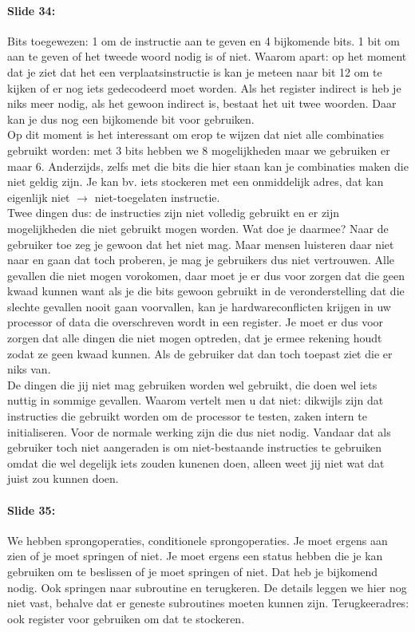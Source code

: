 \documentclass[10pt,a4paper]{book}
\begin{document}
\paragraph{Slide 34:} Bits toegewezen: 1 om de instructie aan te geven en 4 bijkomende bits. 1 bit om aan te geven of het tweede woord nodig is of niet. Waarom apart: op het moment dat je ziet dat het een verplaatsinstructie is kan je meteen naar bit 12 om te kijken of er nog iets gedecodeerd moet worden. Als het register indirect is heb je niks meer nodig, als het gewoon indirect is, bestaat het uit twee woorden. Daar kan je dus nog een bijkomende bit voor gebruiken.\\
Op dit moment is het interessant om erop te wijzen dat niet alle combinaties gebruikt worden: met 3 bits hebben we 8 mogelijkheden maar we gebruiken er maar 6. Anderzijds, zelfs met die bits die hier staan kan je combinaties maken die niet geldig zijn. Je kan bv. iets stockeren met een onmiddelijk adres, dat kan eigenlijk niet $\rightarrow$ niet-toegelaten instructie.\\
Twee dingen dus: de instructies zijn niet volledig gebruikt en er zijn mogelijkheden die niet gebruikt mogen worden. Wat doe je daarmee? Naar de gebruiker toe zeg je gewoon dat het niet mag. Maar mensen luisteren daar niet naar en gaan dat toch proberen, je mag je gebruikers dus niet vertrouwen. Alle gevallen die niet mogen vorokomen, daar moet je er dus voor zorgen dat die geen kwaad kunnen want als je die bits gewoon gebruikt in de veronderstelling dat die slechte gevallen nooit gaan voorvallen, kan je hardwareconflicten krijgen in uw processor of data die overschreven wordt in een register. Je moet er dus voor zorgen dat alle dingen die niet mogen optreden, dat je ermee rekening houdt zodat ze geen kwaad kunnen. Als de gebruiker dat dan toch toepast ziet die er niks van.\\
De dingen die jij niet mag gebruiken worden wel gebruikt, die doen wel iets nuttig in sommige gevallen. Waarom vertelt men u dat niet: dikwijls zijn dat instructies die gebruikt worden om de processor te testen, zaken intern te initialiseren. Voor de normale werking zijn die dus niet nodig. Vandaar dat als gebruiker toch niet aangeraden is om niet-bestaande instructies te gebruiken omdat die wel degelijk iets zouden kunenen doen, alleen weet jij niet wat dat juist zou kunnen doen.

\paragraph{Slide 35:} We hebben sprongoperaties, conditionele sprongoperaties. Je moet ergens aan zien of je moet springen of niet. Je moet ergens een status hebben die je kan gebruiken om te beslissen of je moet springen of niet. Dat heb je bijkomend nodig. Ook springen naar subroutine en terugkeren. De details leggen we hier nog niet vast, behalve dat er geneste subroutines moeten kunnen zijn. Terugkeeradres: ook register voor gebruiken om dat te stockeren. 
\end{document}
